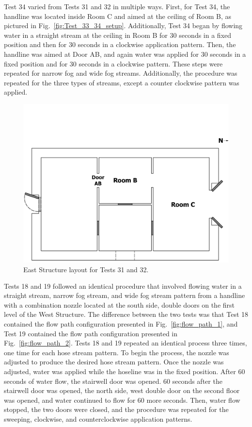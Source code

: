 \documentclass[12pt,oneside]{book}
\begin{document}
Test 34 varied from Tests 31 and 32 in multiple ways. First, for Test 34, the handline was located inside Room C and aimed at the ceiling of Room B, as pictured in Fig.~\ref{fig:Test_33_34_setup}. Additionally, Test 34 began by flowing water in a straight stream at the ceiling in Room B for 30 seconds in a fixed position and then for 30 seconds in a clockwise application pattern. Then, the handline was aimed at Door AB, and again water was applied for 30 seconds in a fixed position and for 30 seconds in a clockwise pattern. These steps were repeated for narrow fog and wide fog streams. Additionally, the procedure was repeated for the three types of streams, except a counter clockwise pattern was applied.

\begin{figure}[!ht]
\includegraphics[trim=0cm 0cm 0cm 4.5cm, clip=true, width=6in]{../Drawings/Specific_Tests/East_Structure_Hose_Test_34}
\caption[East Structure layout for Tests 31 and 32]{East Structure layout for Tests 31 and 32.}
\label{fig:Test_34_setup}
\end{figure}
\FloatBarrier

Tests 18 and 19 followed an identical procedure that involved flowing water in a straight stream, narrow fog stream, and wide fog stream pattern from a handline with a combination nozzle located at the south side, double doors on the first level of the West Structure. The difference between the two tests was that Test 18 contained the flow path configuration presented in Fig.~\ref{fig:flow_path_1}, and Test 19 contained the flow path configuration presented in Fig.~\ref{fig:flow_path_2}. Tests 18 and 19 repeated an identical process three times, one time for each hose stream pattern. To begin the process, the nozzle was adjusted to produce the desired hose stream pattern. Once the nozzle was adjusted, water was applied while the hoseline was in the fixed position. After 60 seconds of water flow, the stairwell door was opened. 60 seconds after the stairwell door was opened, the north side, west double door on the second floor was opened, and water continued to flow for 60 more seconds. Then, water flow stopped, the two doors were closed, and the procedure was repeated for the sweeping, clockwise, and counterclockwise application patterns.
\end{document}
